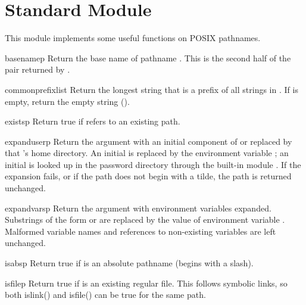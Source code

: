 \section{Standard Module }

This module implements some useful functions on POSIX pathnames.

\renewcommand{\indexsubitem}{(in module posixpath)}
\begin{funcdesc}{basename}{p}
Return the base name of pathname
.
This is the second half of the pair returned by
.
\end{funcdesc}

\begin{funcdesc}{commonprefix}{list}
Return the longest string that is a prefix of all strings in
.
If
is empty, return the empty string ().
\end{funcdesc}

\begin{funcdesc}{exists}{p}
Return true if
refers to an existing path.
\end{funcdesc}

\begin{funcdesc}{expanduser}{p}
Return the argument with an initial component of \samp{\~} or
 replaced by that 's home directory.  An
initial \samp{\~{}} is replaced by the environment variable ;
an initial  is looked up in the password directory through
the built-in module .  If the expansion fails, or if the
path does not begin with a tilde, the path is returned unchanged.
\end{funcdesc}

\begin{funcdesc}{expandvars}{p}
Return the argument with environment variables expanded.  Substrings
of the form  or  are
replaced by the value of environment variable .  Malformed
variable names and references to non-existing variables are left
unchanged.
\end{funcdesc}

\begin{funcdesc}{isabs}{p}
Return true if  is an absolute pathname (begins with a slash).
\end{funcdesc}

\begin{funcdesc}{isfile}{p}
Return true if  is an existing regular file.  This follows
symbolic links, so both islink() and isfile() can be true for the same
path.
\end{funcdesc}

